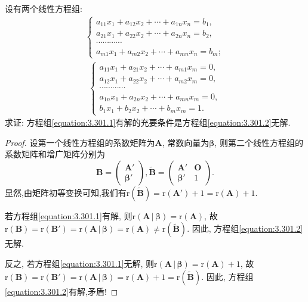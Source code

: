 \documentclass[../../main.tex]{subfiles}
\begin{document}
\begin{example}
设有两个线性方程组:
\begin{align}\label{equation:3.301.1}
\begin{cases}
a_{11}x_1 + a_{12}x_2+\cdots + a_{1n}x_n = b_1,\\
a_{21}x_1 + a_{22}x_2+\cdots + a_{2n}x_n = b_2,\\
\cdots\cdots\cdots\cdots\\
a_{m1}x_1 + a_{m2}x_2+\cdots + a_{mn}x_n = b_m;
\end{cases} 
\end{align}
\begin{align}\label{equation:3.301.2}
\begin{cases}
a_{11}x_1 + a_{21}x_2+\cdots + a_{m1}x_m = 0,\\
a_{12}x_1 + a_{22}x_2+\cdots + a_{m2}x_m = 0,\\
\cdots\cdots\cdots\cdots\\
a_{1n}x_1 + a_{2n}x_2+\cdots + a_{mn}x_m = 0,\\
b_1x_1 + b_2x_2+\cdots + b_mx_m = 1.
\end{cases}
\end{align}
求证: 方程组\eqref{equation:3.301.1}有解的充要条件是方程组\eqref{equation:3.301.2}无解.
\end{example}
\begin{proof}
设第一个线性方程组的系数矩阵为\(\boldsymbol{A}\), 常数向量为\(\boldsymbol{\beta}\), 则第二个线性方程组的系数矩阵和增广矩阵分别为
\[
\boldsymbol{B}=\begin{pmatrix}
\boldsymbol{A}'\\
\boldsymbol{\beta}'
\end{pmatrix},\widetilde{\boldsymbol{B}}=\begin{pmatrix}
\boldsymbol{A}'&\boldsymbol{O}\\
\boldsymbol{\beta}'&1
\end{pmatrix}.
\]
显然,由矩阵初等变换可知,我们有\(\mathrm{r}(\widetilde{\boldsymbol{B}})=\mathrm{r}(\boldsymbol{A}') + 1=\mathrm{r}(\boldsymbol{A})+1\).

若方程组\eqref{equation:3.301.1}有解, 则\(\mathrm{r}\left( \boldsymbol{A}\,|\,\boldsymbol{\beta } \right) =\mathrm{r}(\boldsymbol{A})\), 故\(\mathrm{r}(\boldsymbol{B})=\mathrm{r}(\boldsymbol{B}')=\mathrm{r}\left( \boldsymbol{A}\,|\,\boldsymbol{\beta } \right) =\mathrm{r}(\boldsymbol{A})\neq\mathrm{r}(\widetilde{\boldsymbol{B}})\). 因此, 方程组\eqref{equation:3.301.2}无解.

反之, 若方程组\eqref{equation:3.301.1}无解, 则\(\mathrm{r}\left( \boldsymbol{A}\,|\,\boldsymbol{\beta } \right) =\mathrm{r}(\boldsymbol{A}) + 1\), 故\(\mathrm{r}(\boldsymbol{B})=\mathrm{r}(\boldsymbol{B}')=\mathrm{r}\left( \boldsymbol{A}\,|\,\boldsymbol{\beta } \right) =\mathrm{r}(\boldsymbol{A})+1=\mathrm{r}(\widetilde{\boldsymbol{B}})\). 因此, 方程组\eqref{equation:3.301.2}有解,矛盾!
\end{proof}
\end{document}
